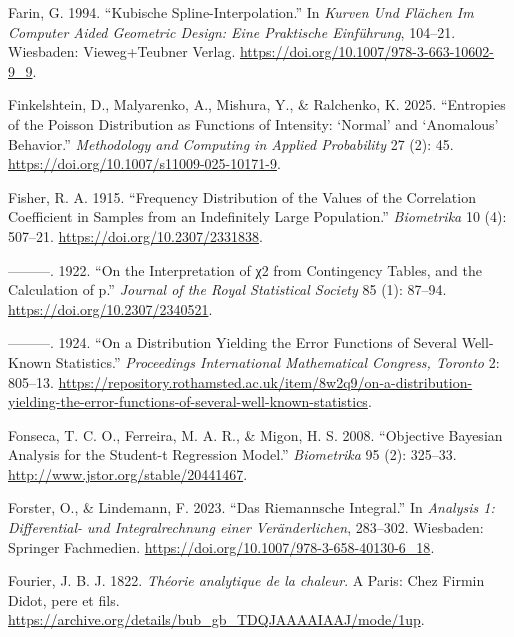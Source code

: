 \documentclass[
]{article}
\newlength{\cslhangindent}
\newlength{\cslentryspacingunit} %
\newenvironment{CSLReferences}[2] %
 {%
  \setlength{\parindent}{0pt}
  \ifodd #1
  \let\oldpar\par
  \def\par{\hangindent=\cslhangindent\oldpar}
  \fi
  \setlength{\parskip}{#2\cslentryspacingunit}
 }%
 {}
\begin{document}
\begin{CSLReferences}{1}{0}
\leavevmode{}%
Farin, G. 1994. {``Kubische Spline-Interpolation.''} In \emph{Kurven Und
Fl{ä}chen Im Computer Aided Geometric Design: Eine Praktische
Einf{ü}hrung}, 104--21. Wiesbaden: Vieweg+Teubner Verlag.
\url{https://doi.org/10.1007/978-3-663-10602-9_9}.

\leavevmode{}%
Finkelshtein, D., Malyarenko, A., Mishura, Y., \& Ralchenko, K. 2025.
{``Entropies of the Poisson Distribution as Functions of Intensity:
{`Normal'} and {`Anomalous'} Behavior.''} \emph{Methodology and
Computing in Applied Probability} 27 (2): 45.
\url{https://doi.org/10.1007/s11009-025-10171-9}.

\leavevmode{}%
Fisher, R. A. 1915. {``Frequency Distribution of the Values of the
Correlation Coefficient in Samples from an Indefinitely Large
Population.''} \emph{Biometrika} 10 (4): 507--21.
\url{https://doi.org/10.2307/2331838}.

\leavevmode{}%
---------. 1922. {``On the Interpretation of {χ2} from Contingency
Tables, and the Calculation of p.''} \emph{Journal of the Royal
Statistical Society} 85 (1): 87--94.
\url{https://doi.org/10.2307/2340521}.

\leavevmode{}%
---------. 1924. {``On a Distribution Yielding the Error Functions of
Several Well-Known Statistics.''} \emph{Proceedings International
Mathematical Congress, Toronto} 2: 805--13.
\url{https://repository.rothamsted.ac.uk/item/8w2q9/on-a-distribution-yielding-the-error-functions-of-several-well-known-statistics}.

\leavevmode{}%
Fonseca, T. C. O., Ferreira, M. A. R., \& Migon, H. S. 2008.
{``{Objective Bayesian Analysis for the Student-t Regression Model}.''}
\emph{Biometrika} 95 (2): 325--33.
\url{http://www.jstor.org/stable/20441467}.

\leavevmode{}%
Forster, O., \& Lindemann, F. 2023. {``Das Riemannsche Integral.''} In
\emph{{Analysis 1: Differential- und Integralrechnung einer
Veränderlichen}}, 283--302. Wiesbaden: Springer Fachmedien.
\url{https://doi.org/10.1007/978-3-658-40130-6_18}.

\leavevmode{}%
Fourier, J. B. J. 1822. \emph{{Théorie analytique de la chaleur}}. A
Paris: Chez Firmin Didot, pere et fils.
\url{https://archive.org/details/bub_gb_TDQJAAAAIAAJ/mode/1up}.


\end{CSLReferences}
\end{document}
